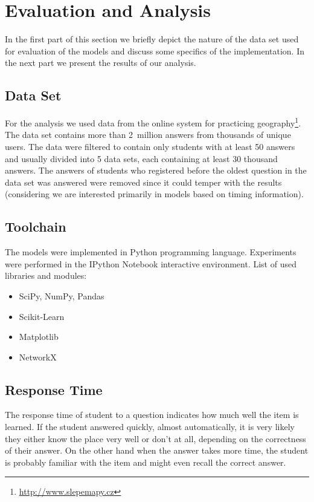 \chapter{Evaluation and Analysis}

In the first part of this section we briefly depict the nature of the data set used for evaluation of the models and discuss some specifics of the implementation. In the next part we present the results of our analysis.

\section{Data Set}


For the analysis we used data from the online system for practicing geography\footnote{\url{http://www.slepemapy.cz}}. The data set contains more than 2~million answers from thousands of unique users. The data were filtered to contain only students with at least 50 answers and usually divided into 5 data sets, each containing at least 30 thousand answers. The answers of students who registered before the oldest question in the data set was answered were removed since it could temper with the results (considering we are interested primarily in models based on timing information).

\section{Toolchain}

The models were implemented in Python programming language. Experiments were performed in the IPython Notebook interactive environment. List of used libraries and modules:

\begin{itemize}
  \item SciPy, NumPy, Pandas
  \item Scikit-Learn
  \item Matplotlib
  \item NetworkX
\end{itemize}

\section{Response Time}

The response time of student to a question indicates how much well the item is learned. If the student answered quickly, almost automatically, it is very likely they either know the place very well or don't at all, depending on the correctness of their answer. On the other hand when the answer takes more time, the student is probably familiar with the item and might even recall the correct answer.

